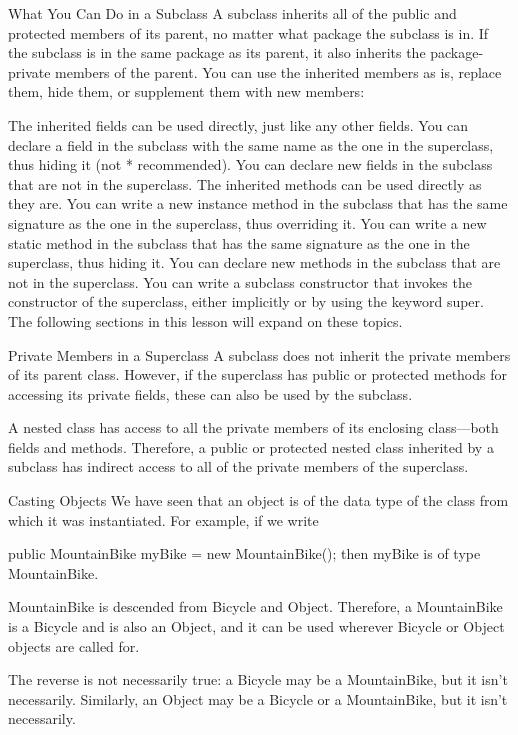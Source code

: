 What You Can Do in a Subclass
A subclass inherits all of the public and protected members of its parent, no matter what package the subclass is in. If the subclass is in the same package as its parent, it also inherits the package-private members of the parent. You can use the inherited members as is, replace them, hide them, or supplement them with new members:

The inherited fields can be used directly, just like any other fields.
You can declare a field in the subclass with the same name as the one in the superclass, thus hiding it (not * recommended).
You can declare new fields in the subclass that are not in the superclass.
The inherited methods can be used directly as they are.
You can write a new instance method in the subclass that has the same signature as the one in the superclass, thus overriding it.
You can write a new static method in the subclass that has the same signature as the one in the superclass, thus hiding it.
You can declare new methods in the subclass that are not in the superclass.
You can write a subclass constructor that invokes the constructor of the superclass, either implicitly or by using the keyword super.
The following sections in this lesson will expand on these topics.

Private Members in a Superclass
A subclass does not inherit the private members of its parent class. However, if the superclass has public or protected methods for accessing its private fields, these can also be used by the subclass.

A nested class has access to all the private members of its enclosing class—both fields and methods. Therefore, a public or protected nested class inherited by a subclass has indirect access to all of the private members of the superclass.

Casting Objects
We have seen that an object is of the data type of the class from which it was instantiated. For example, if we write

public MountainBike myBike = new MountainBike();
then myBike is of type MountainBike.

MountainBike is descended from Bicycle and Object. Therefore, a MountainBike is a Bicycle and is also an Object, and it can be used wherever Bicycle or Object objects are called for.

The reverse is not necessarily true: a Bicycle may be a MountainBike, but it isn't necessarily. Similarly, an Object may be a Bicycle or a MountainBike, but it isn't necessarily.

